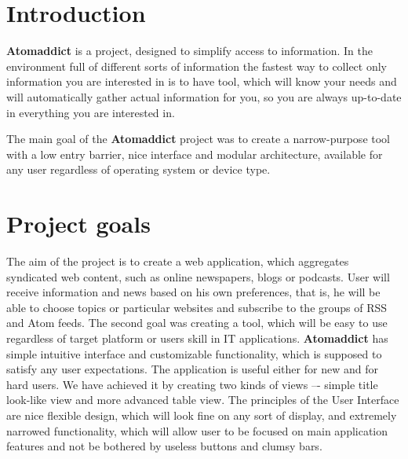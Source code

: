 \documentclass[12pt]{article}
\begin{document}
\maketitle

\newpage

\section{Introduction}
\textbf{Atomaddict} is a project, designed to simplify access to information. In the environment full of different sorts of information the fastest way to collect only information you are interested in is to have tool, which will know your needs and will automatically gather actual information for you, so you are always up-to-date in everything you are interested in.

The main goal of the \textbf{Atomaddict} project was to create a narrow-purpose tool with a low entry barrier, nice interface and modular architecture, available for any user regardless of operating system or device type. 


\section{Project goals}\label{project goals}
The aim of the project is to create a web application, which aggregates syndicated web content, such as online newspapers, blogs or podcasts. User will receive information and news based on his own preferences, that is, he will be able to choose topics or particular websites and subscribe to the groups of RSS and Atom feeds. 
The second goal was creating a tool, which will be easy to use regardless of target platform or users skill in IT applications. \textbf{Atomaddict} has simple intuitive interface and customizable functionality, which is supposed to satisfy any user expectations.
The application is useful either for new and for hard users. We have achieved it by creating two kinds of views –- simple title look-like view and more advanced table view. The principles of the User Interface are nice flexible design, which will look fine on any sort of display, and extremely narrowed functionality, which will allow user to be focused on main application features and not be bothered by useless buttons and clumsy bars.
\end{document}
